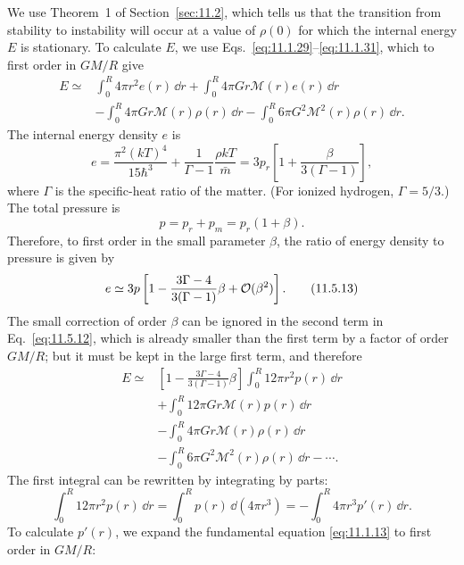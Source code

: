 We use Theorem~1 of Section~\ref{sec:11.2}, which tells us that the
transition from stability to instability will occur at a value of \(\rho(0)\)
for which the internal energy \(E\) is stationary. To calculate \(E\), we use
Eqs.~\eqref{eq:11.1.29}--\eqref{eq:11.1.31}, which to first order in
\(GM/R\) give
\begin{equation}
  \begin{aligned}
  E\simeq{}&
  \int_0^R4\pi r^2e(r)\,\dd r
  +\int_0^R4\pi Gr\mathcal{M}(r)e(r)\,\dd r\\
  &-\int_0^R4\pi Gr\mathcal{M}(r)\rho(r)\,\dd r
  -\int_0^R6\pi G^2\mathcal{M}^2(r)\rho(r)\,\dd r.
  \end{aligned}
  \tag{11.5.12}\label{eq:11.5.12}
\end{equation}
The internal energy density \(e\) is
\[
  e
  =
  \frac{\pi^2(kT)^4}{15\hbar^3}
  +\frac1{\Gamma-1}\frac{\rho kT}{\bar m}
  =
  3p_r\left[1+\frac{\beta}{3(\Gamma-1)}\right],
\]
where \(\Gamma\) is the specific-heat ratio of the matter. (For ionized
hydrogen, \(\Gamma=5/3\).) The total pressure is
\[
  p=p_r+p_m=p_r(1+\beta).
\]
Therefore, to first order in the small parameter \(\beta\), the ratio of
energy density to pressure is given by
\begin{equation}
  e
  \simeq
  3p
  \left[
    1-\frac{3\Gamma-4}{3(\Gamma-1)}\beta
    +\mathcal{O}(\beta^2)
  \right].
  \tag{11.5.13}\label{eq:11.5.13}
\end{equation}
The small correction of order \(\beta\) can be ignored in the second term in
Eq.~\eqref{eq:11.5.12}, which is already smaller than the first term by a
factor of order \(GM/R\); but it must be kept in the large first term, and
therefore
\begin{equation}
  \begin{aligned}
  E\simeq{}&
  \left[1-\frac{3\Gamma-4}{3(\Gamma-1)}\beta\right]
  \int_0^R12\pi r^2p(r)\,\dd r\\
  &+\int_0^R12\pi Gr\mathcal{M}(r)p(r)\,\dd r\\
  &-\int_0^R4\pi Gr\mathcal{M}(r)\rho(r)\,\dd r\\
  &-\int_0^R6\pi G^2\mathcal{M}^2(r)\rho(r)\,\dd r-\cdots.
  \end{aligned}
  \tag{11.5.14}\label{eq:11.5.14}
\end{equation}
The first integral can be rewritten by integrating by parts:
\[
  \int_0^R12\pi r^2p(r)\,\dd r
  =
  \int_0^Rp(r)\,\dd(4\pi r^3)
  =
  -\int_0^R4\pi r^3p'(r)\,\dd r.
\]
To calculate \(p'(r)\), we expand the fundamental equation
\eqref{eq:11.1.13} to first order in \(GM/R\):
